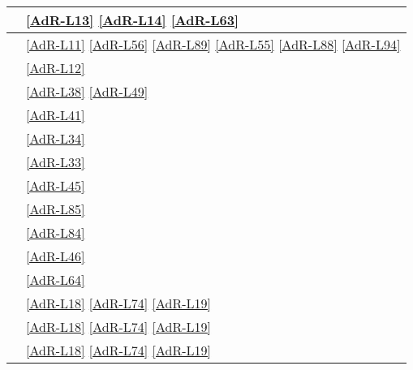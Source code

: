 \begin{longtable}{|>{\centering}P{7cm}|>{\centering}P{5cm}|}
	\hline {} & \ref{AdR-L13} \linebreak \ref{AdR-L14} \linebreak \ref{AdR-L63} \tabularnewline
	\hline {} & \ref{AdR-L11} \linebreak \ref{AdR-L56} \linebreak \ref{AdR-L89} \linebreak \ref{AdR-L55} \linebreak \ref{AdR-L88} \linebreak \ref{AdR-L94} \tabularnewline
	\hline {} & \ref{AdR-L12} \tabularnewline
	\hline {} & \ref{AdR-L38} \linebreak \ref{AdR-L49} \tabularnewline
	\hline {} & \ref{AdR-L41} \tabularnewline
	\hline {} & \ref{AdR-L34} \tabularnewline
	\hline {} & \ref{AdR-L33} \tabularnewline
	\hline {} & \ref{AdR-L45} \tabularnewline
	\hline {} & \ref{AdR-L85} \tabularnewline
	\hline {} & \ref{AdR-L84} \tabularnewline
	\hline {} & \ref{AdR-L46} \tabularnewline
	\hline {} & \ref{AdR-L64} \tabularnewline
	
	\hline {} & \ref{AdR-L18} \linebreak \ref{AdR-L74} \linebreak \ref{AdR-L19} \tabularnewline
	\hline {} & \ref{AdR-L18} \linebreak \ref{AdR-L74} \linebreak \ref{AdR-L19} \tabularnewline
	\hline {} & \ref{AdR-L18} \linebreak \ref{AdR-L74} \linebreak \ref{AdR-L19} \tabularnewline
	

\end{longtable}
